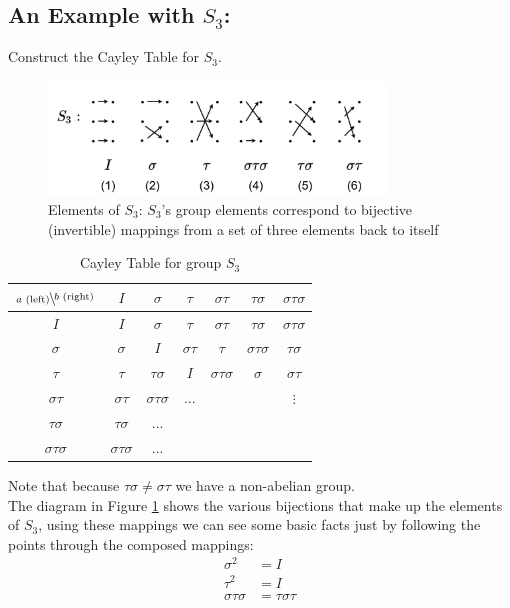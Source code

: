\subsection{An Example with $S_3$:} Construct the Cayley Table for $S_3$.
\begin{figure}[ht!]
    \centering
    \includegraphics[width=0.8\textwidth]{Figures/S_3 Group Example.pdf}
    \caption{Elements of $S_3$: $S_3$'s group elements correspond to bijective (invertible) mappings from a set of three elements back to itself}
    \label{fig:S3elts}
\end{figure}
\begin{table}[h!]
    \centering
    \begin{tabular}{c||c|c|c|c|c|c|}
         $\bsfrac{b\text{ (right)}}{a\text{ (left)}}$& $I$&$\sigma$&$\tau$&$\sigma\tau$&$\tau\sigma$&$\sigma\tau\sigma$  \\ \hline \hline
         $I$&$I$&$\sigma$&$\tau$&$\sigma\tau$&$\tau\sigma$&$\sigma\tau\sigma$  \\ \hline
         $\sigma$&$\sigma$&$I$&$\sigma\tau$&$\tau$&$\sigma\tau\sigma$& $\tau\sigma$\\ \hline
         $\tau$&$\tau$&$\tau\sigma$&$I$&$\sigma\tau\sigma$ &$\sigma$ &$\sigma\tau$  \\ \hline
         $\sigma\tau$&$\sigma\tau$& $\sigma\tau\sigma$&... & & &$\vdots$ \\ \hline
         $\tau\sigma$ & $\tau \sigma$ &... & & & &   \\ \hline
         $\sigma\tau\sigma$ & $\sigma\tau\sigma$ &... & & & &   \\ \hline
    \end{tabular}
    \caption{Cayley Table for group $S_3$}
    \label{tab:Cayley_S3}
\end{table}
Note that because $\tau\sigma\neq \sigma \tau$ we have a non-abelian group. \steezybreak\\
\noindent The diagram in Figure \ref{fig:S3elts} shows the various bijections that make up the elements of $S_3$, using these mappings we can see some basic facts just by following the points through the composed mappings:
\begin{align}
    \sigma^2&= I \nonumber \\
    \tau^2&=I \nonumber \\
    \sigma\tau\sigma&=\tau\sigma\tau \nonumber
\end{align}
